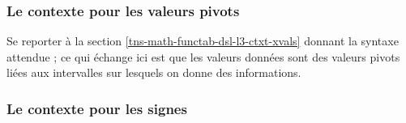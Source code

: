 \documentclass[10pt, a4paper]{article}
\begin{document}


\subsubsection{Le contexte  pour les valeurs pivots}

Se reporter à la section \ref{tns-math-functab-dsl-l3-ctxt-xvals} donnant la syntaxe attendue ; ce qui échange ici est que les valeurs données sont des valeurs pivots liées aux intervalles sur lesquels on donne des informations.



\subsubsection{Le contexte  pour les signes}
\end{document}
